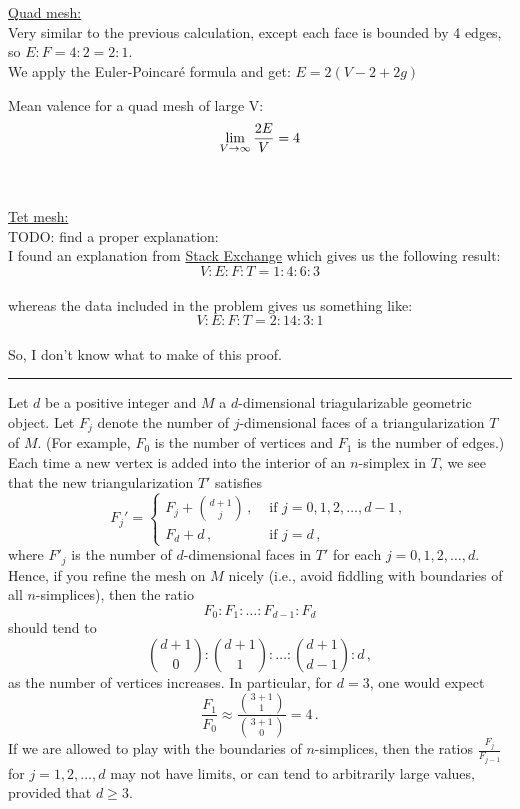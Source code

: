 \documentclass{article}
\begin{document}
\vspace{1.8cm}
\\\\

\underline{Quad mesh:}\\
Very similar to the previous calculation, except each face is bounded by 4 edges, so $E:F = 4:2 = 2:1$.\\
We apply the Euler-Poincaré formula and get: $E = 2(V-2+2g)$

Mean valence for a quad mesh of large V:\\
\begin{equation}
    \lim_{V\to\infty} \frac{2E}{V} = 4
    \notag
\end{equation}

\vspace{1.8cm}
\\\\

\underline{Tet mesh:}\\
TODO: find a proper explanation:\\
I found an explanation from \href{https://math.stackexchange.com/q/1879347}{Stack Exchange} which gives us the following result:\\
$$V:E:F:T = 1:4:6:3$$ \\
whereas the data included in the problem gives us something like:\\
$$V:E:F:T = 2:14:3:1$$ \\
So, I don't know what to make of this proof.\\
\par\noindent\rule{0.25\textwidth}{0.4pt}


Let $d$ be a positive integer and $M$ a $d$-dimensional triagularizable geometric object.  Let $F_j$ denote the number of $j$-dimensional faces of a triangularization $T$ of $M$.  (For example, $F_0$ is the number of vertices and $F_1$ is the number of edges.)  Each time a new vertex is added into the interior of an $n$-simplex in $T$, we see that the new triangularization $T'$ satisfies
$$
F_j'=
\begin{cases}
    F_j+\binom{d+1}{j}\,,&\text{ if }j=0,1,2,\ldots,d-1\,,\\
    F_d+d\,,&\text{ if }j=d\,,
\end{cases}
$$
where $F'_j$ is the number of $d$-dimensional faces in $T'$ for each $j=0,1,2,\ldots,d$.  Hence, if you refine the mesh on $M$ nicely (i.e., avoid fiddling with boundaries of all $n$-simplices), then the ratio
$$F_0:F_1:\ldots:F_{d-1}:F_d$$
should tend to
$$\binom{d+1}{0}:\binom{d+1}{1}:\ldots:\binom{d+1}{d-1}:d\,,$$
as the number of vertices increases.  In particular, for $d=3$, one would expect $$\frac{F_1}{F_0}\approx \frac{\binom{3+1}{1}}{\binom{3+1}{0}}=4\,.$$  If we are allowed to play with the boundaries of $n$-simplices, then the ratios $\frac{F_{j}}{F_{j-1}}$ for $j=1,2,\ldots,d$ may not have limits, or can tend to arbitrarily large values, provided that $d\geq 3$.
\end{document}

